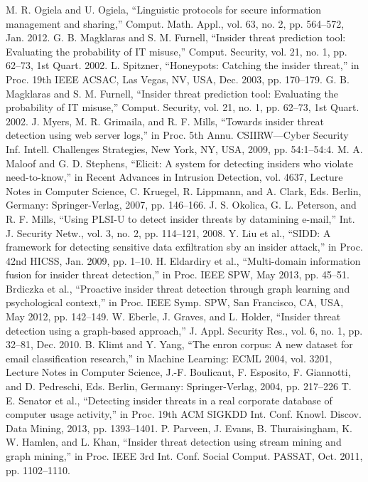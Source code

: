 \documentclass[conference]{IEEEtran}
\begin{document}
\begin{thebibliography}{00}
 M. R. Ogiela and U. Ogiela, “Linguistic protocols for secure information management and sharing,” Comput. Math. Appl., vol. 63, no. 2, pp. 564–572, Jan. 2012.
G. B. Magklaras and S. M. Furnell, “Insider threat prediction tool: Evaluating the probability of IT misuse,” Comput. Security, vol. 21, no. 1, pp. 62–73, 1st Quart. 2002.
 L. Spitzner, “Honeypots: Catching the insider threat,” in Proc. 19th IEEE ACSAC, Las Vegas, NV, USA, Dec. 2003, pp. 170–179.
G. B. Magklaras and S. M. Furnell, “Insider threat prediction tool: Evaluating the probability of IT misuse,” Comput. Security, vol. 21, no. 1, pp. 62–73, 1st Quart. 2002.
 J. Myers, M. R. Grimaila, and R. F. Mills, “Towards insider threat detection using web server logs,” in Proc. 5th Annu. CSIIRW—Cyber Security Inf. Intell. Challenges Strategies, New York, NY, USA, 2009, pp. 54:1–54:4.
 M. A. Maloof and G. D. Stephens, “Elicit: A system for detecting insiders who violate need-to-know,” in Recent Advances in Intrusion Detection, vol. 4637, Lecture Notes in Computer Science, C. Kruegel, R. Lippmann, and A. Clark, Eds. Berlin, Germany: Springer-Verlag, 2007, pp. 146–166.
 J. S. Okolica, G. L. Peterson, and R. F. Mills, “Using PLSI-U to detect insider threats by datamining e-mail,” Int. J. Security Netw., vol. 3, no. 2, pp. 114–121, 2008.
Y. Liu et al., “SIDD: A framework for detecting sensitive data exfiltration sby an insider attack,” in Proc. 42nd HICSS, Jan. 2009, pp. 1–10.
 H. Eldardiry et al., “Multi-domain information fusion for insider threat detection,” in Proc. IEEE SPW, May 2013, pp. 45–51.
 Brdiczka et al., “Proactive insider threat detection through graph learning and psychological context,” in Proc. IEEE Symp. SPW, San Francisco, CA, USA, May 2012, pp. 142–149.
W. Eberle, J. Graves, and L. Holder, “Insider threat detection using a graph-based approach,” J. Appl. Security Res., vol. 6, no. 1, pp. 32–81, Dec. 2010.
B. Klimt and Y. Yang, “The enron corpus: A new dataset for email classification research,” in Machine Learning: ECML 2004, vol. 3201, Lecture Notes in Computer Science, J.-F. Boulicaut, F. Esposito, F. Giannotti, and D. Pedreschi, Eds. Berlin, Germany: Springer-Verlag, 2004, pp. 217–226
T. E. Senator et al., “Detecting insider threats in a real corporate database of computer usage activity,” in Proc. 19th ACM SIGKDD Int. Conf. Knowl. Discov. Data Mining, 2013, pp. 1393–1401.
P. Parveen, J. Evans, B. Thuraisingham, K. W. Hamlen, and L. Khan, “Insider threat detection using stream mining and graph mining,” in Proc. IEEE 3rd Int. Conf. Social Comput. PASSAT, Oct. 2011, pp. 1102–1110.

\end{thebibliography}
\end{document}
